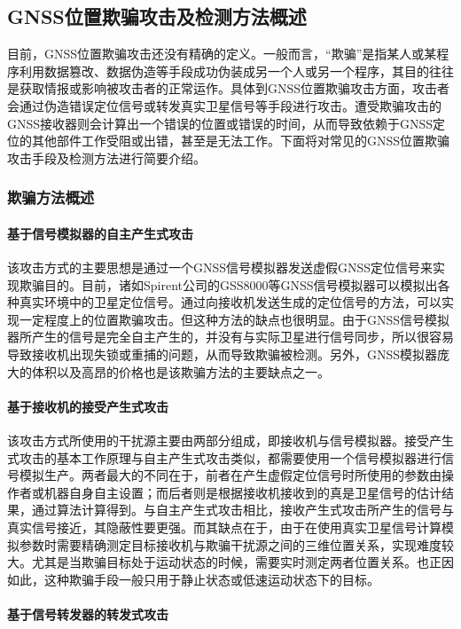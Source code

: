 \subsection{GNSS位置欺骗攻击及检测方法概述}
目前，GNSS位置欺骗攻击还没有精确的定义。一般而言，“欺骗”是指某人或某程序利用数据篡改、数据伪造等手段成功伪装成另一个人或另一个程序，其目的往往是获取情报或影响被攻击者的正常运作。具体到GNSS位置欺骗攻击方面，攻击者会通过伪造错误定位信号或转发真实卫星信号等手段进行攻击。遭受欺骗攻击的GNSS接收器则会计算出一个错误的位置或错误的时间，从而导致依赖于GNSS定位的其他部件工作受阻或出错，甚至是无法工作。下面将对常见的GNSS位置欺骗攻击手段及检测方法进行简要介绍。
\subsubsection{欺骗方法概述}
\paragraph{基于信号模拟器的自主产生式攻击}

该攻击方式的主要思想是通过一个GNSS信号模拟器发送虚假GNSS定位信号来实现欺骗目的。目前，诸如Spirent公司的GSS8000等GNSS信号模拟器可以模拟出各种真实环境中的卫星定位信号。通过向接收机发送生成的定位信号的方法，可以实现一定程度上的位置欺骗攻击。但这种方法的缺点也很明显。由于GNSS信号模拟器所产生的信号是完全自主产生的，并没有与实际卫星进行信号同步，所以很容易导致接收机出现失锁或重捕的问题，从而导致欺骗被检测。另外，GNSS模拟器庞大的体积以及高昂的价格也是该欺骗方法的主要缺点之一。
\paragraph{基于接收机的接受产生式攻击}

该攻击方式所使用的干扰源主要由两部分组成，即接收机与信号模拟器。接受产生式攻击的基本工作原理与自主产生式攻击类似，都需要使用一个信号模拟器进行信号模拟生产。两者最大的不同在于，前者在产生虚假定位信号时所使用的参数由操作者或机器自身自主设置；而后者则是根据接收机接收到的真是卫星信号的估计结果，通过算法计算得到。与自主产生式攻击相比，接收产生式攻击所产生的信号与真实信号接近，其隐蔽性要更强。而其缺点在于，由于在使用真实卫星信号计算模拟参数时需要精确测定目标接收机与欺骗干扰源之间的三维位置关系，实现难度较大。尤其是当欺骗目标处于运动状态的时候，需要实时测定两者位置关系。也正因如此，这种欺骗手段一般只用于静止状态或低速运动状态下的目标。
\paragraph{基于信号转发器的转发式攻击}

